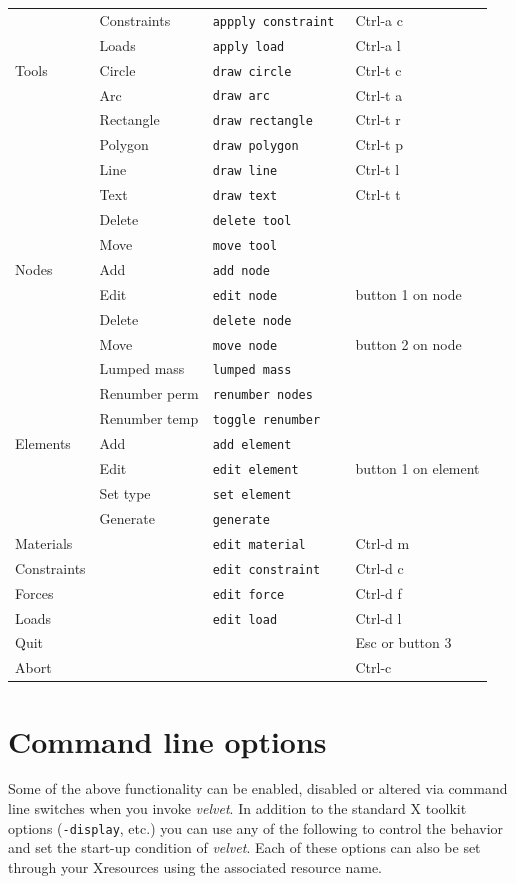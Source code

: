 {\begin{center}
\begin{tabular}{p{1in}p{1.25in}p{1.75in}p{1.5in}}
		& Constraints	& \tt appply constraint & Ctrl-a c \\
		& Loads		& \tt apply load	& Ctrl-a l \\
Tools		& Circle	& \tt draw circle 	& Ctrl-t c \\
		& Arc		& \tt draw arc 		& Ctrl-t a \\
		& Rectangle	& \tt draw rectangle 	& Ctrl-t r \\
		& Polygon	& \tt draw polygon 	& Ctrl-t p \\
		& Line		& \tt draw line 	& Ctrl-t l \\
		& Text		& \tt draw text 	& Ctrl-t t \\
		& Delete	& \tt delete tool 	& \\
		& Move		& \tt move tool		& \\
Nodes		& Add		& \tt add node 		& \\
		& Edit		& \tt edit node		& button 1 on node \\
		& Delete	& \tt delete node	& \\
		& Move		& \tt move node		& button 2 on node \\
                & Lumped mass   & \tt lumped mass       & \\
                & Renumber perm & \tt renumber nodes    & \\
		& Renumber temp & \tt toggle renumber	& \\
Elements 	& Add		& \tt add element 	& \\
		& Edit		& \tt edit element 	& button 1 on element \\
		& Set type	& \tt set element 	& \\
		& Generate	& \tt generate 		& \\
Materials	&		& \tt edit material 	& Ctrl-d m \\
Constraints	&		& \tt edit constraint 	& Ctrl-d c \\
Forces		&		& \tt edit force 	& Ctrl-d f \\
Loads		&		& \tt edit load 	& Ctrl-d l \\
Quit		&		&			& Esc or button 3 \\
Abort		&		&			& Ctrl-c \\ 
 \end{tabular}
\end{center}}

\section{Command line options}
Some of the above functionality can be enabled, disabled or altered via
command line switches when you invoke {\em velvet}.  In addition
to the standard X toolkit options ({\tt -display}, etc.) you can
use any of the following to control the behavior and set the start-up
condition of {\em velvet}.  Each of these options can also be set through
your Xresources using the associated resource name.  

